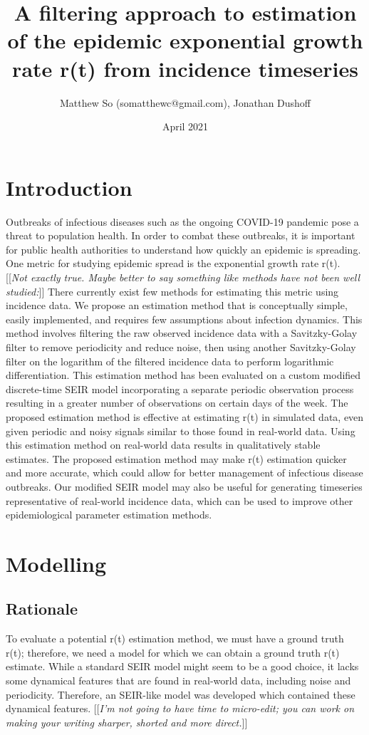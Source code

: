 \documentclass{article}
\title{A filtering approach to estimation of the epidemic exponential growth rate r(t) from incidence timeseries}
\author{Matthew So (somatthewc@gmail.com), Jonathan Dushoff}
\date{April 2021}
\newcommand{\jd}[1]{[[\textsl{#1}]]}
\begin{document}
\maketitle
\tableofcontents

\section{Introduction}
Outbreaks of infectious diseases such as the ongoing COVID-19 pandemic pose a threat to population health. In order to combat these outbreaks, it is important for public health authorities to understand how quickly an epidemic is spreading. One metric for studying epidemic spread is the exponential growth rate r(t). \jd{Not exactly true. Maybe better to say something like methods have not been well studied:}
There currently exist few methods for estimating this metric using incidence data. We propose an estimation method that is conceptually simple,  easily implemented, and requires few assumptions about infection dynamics. This method involves filtering the raw observed incidence data with a Savitzky-Golay filter to remove periodicity and reduce noise, then using another Savitzky-Golay filter on the logarithm of the filtered incidence data to perform logarithmic differentiation. This estimation method has been evaluated on a custom modified discrete-time SEIR model incorporating a separate periodic observation process resulting in a greater number of observations on certain days of the week. The proposed estimation method is effective at estimating r(t) in simulated data, even given periodic and noisy signals similar to those found in real-world data. Using this estimation method on real-world data results in qualitatively stable estimates. The proposed estimation method may make r(t) estimation quicker and more accurate, which could allow for better management of infectious disease outbreaks. Our modified SEIR model may also be useful for generating timeseries representative of real-world incidence data, which can be used to improve other epidemiological parameter estimation methods.

\section{Modelling}

\subsection{Rationale}
To evaluate a potential r(t) estimation method, we must have a ground truth r(t); therefore, we need a model for which we can obtain a ground truth r(t) estimate. While a standard SEIR model might seem to be a good choice, it lacks some dynamical features that are found in real-world data, including noise and periodicity. Therefore, an SEIR-like model was developed which contained these dynamical features. 
\jd{I'm not going to have time to micro-edit; you can work on making your writing sharper, shorted and more direct.}
\end{document}
